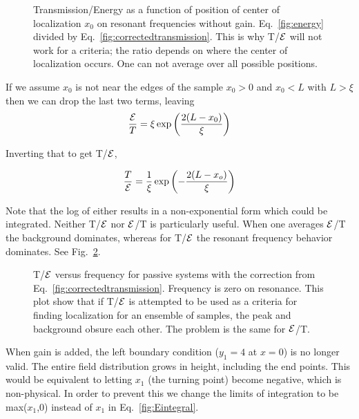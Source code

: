 \begin{figure}
\vskip -0.5cm
\centerline{
}
\vskip -0.5cm
\caption{Transmission/Energy as a function of position of center
of localization $x_0$ on resonant frequencies without gain. Eq.~\ref{fig:energy}
divided by Eq.~\ref{fig:correctedtransmission}. This is why T/${\cal E}$ will not work
for a criteria; the ratio depends on where the center of localization occurs. 
One can not average over all possible positions.}
\label{fig:energytranspassive}
\end{figure}

If we assume $x_0$ is not near the edges of the sample $x_0 > 0$ and $x_0 < L$ with $L > \xi$ then we can drop the last two terms, leaving
\begin{equation}
\frac{\cal E}{T} = \xi \exp\left(\frac{2(L-x_0)}{\xi}\right)
\end{equation}

Inverting that to get T/${\cal E}$,

\begin{equation}
\frac{T}{\cal E} = \frac{1}{\xi} \exp\left(-\frac{2(L-x_o)}{\xi}\right)
\end{equation}

Note that the log of either results in a non-exponential form which could be integrated. Neither T/${\cal E}$ nor ${\cal E}$/T is particularly useful. When one averages ${\cal E}$/T the background dominates, whereas for T/${\cal E}$ the resonant frequency behavior dominates. See Fig.~\ref{fig:logTEET}.

\begin{figure}
\vskip -0.5cm
\centerline{
}
\vskip -0.5cm
\caption{T/${\cal E}$ versus frequency for passive systems
with the correction from Eq.~\ref{fig:correctedtransmission}. Frequency 
is zero on resonance. This plot show that
if T/${\cal E}$ is attempted to be used as a criteria for 
finding localization for an ensemble of samples, the peak and background
obsure each other. The problem is the same for ${\cal E}$/T.}
\label{fig:logTEET}
\end{figure}

When gain is added, the left boundary condition ($y_1=4$ at $x=0$) is no
longer valid. The entire field distribution grows in height, including
the end points. This would be equivalent to letting $x_1$ (the turning
point) become negative, which is non-physical. In order to prevent this
we change the limits of integration to be max($x_1$,0) instead of $x_1$ 
in Eq.~\ref{fig:Eintegral}.

